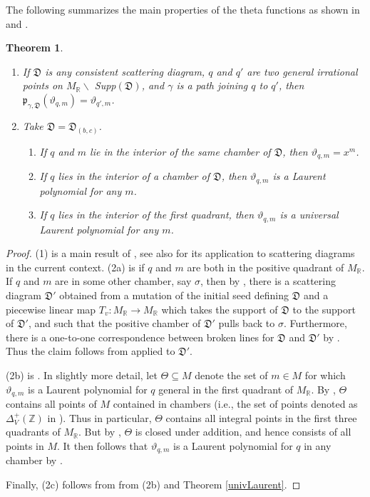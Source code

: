 \documentclass[11pt]{amsart}
\newtheorem{theorem}{Theorem}[section]
\theoremstyle{remark}
\numberwithin{equation}{section}
\newcommand{\RR}{\mathbb{R}}
\newcommand{\ZZ}{\mathbb{Z}}
\newcommand{\fD}{\mathfrak{D}}
\newcommand{\fp}{\mathfrak{p}}
\begin{document}
The following summarizes the main properties of the theta functions as shown in
\cite{CPS} and \cite{GHKK}.
\begin{theorem} $ $
  \begin{enumerate}
    \item
      If $\fD$ is any consistent scattering diagram, $q$ and $q'$ are two general
      irrational points on $M_{\RR} \smallsetminus$ Supp$(\fD)$, and $\gamma$ is a
      path joining $q$ to $q'$, then $\fp_{\gamma, \fD }(\vartheta_{q,m}) = \vartheta_{q', m}$. 
    \item Take $\fD=\fD_{(b,c)}$. 
      \begin{enumerate}
        \item If $q$ and $m$ lie in the interior of the same chamber of $\fD$, then $\vartheta_{q,m}=x^{m}$.
        \item If $q$ lies in the interior of a chamber of $\fD$, then $\vartheta_{q,m}$ is a Laurent polynomial for any $m$.
        \item If $q$ lies in the interior of the first quadrant, then $\vartheta_{q,m}$ is a universal Laurent polynomial for any $m$.
      \end{enumerate}
  \end{enumerate}
\end{theorem}

\begin{proof}
  (1) is a main result of \cite{CPS}, see also \cite[Theorem~3.5]{GHKK} for its
application to scattering diagrams in the current context. (2a) is 
\cite[Proposition~3.8]{GHKK} if $q$ and $m$ are both in the positive quadrant
of $M_{\RR}$. If $q$ and $m$ are in some other chamber, say $\sigma$, then
by \cite[Construction~1.38]{GHKK}, there is a scattering diagram $\fD'$
obtained from a mutation of the initial seed defining $\fD$ and a piecewise
linear map $T_v:M_{\RR}\rightarrow M_{\RR}$ which takes the support of
$\fD$ to the support of $\fD'$, and such that the positive chamber of $\fD'$
pulls back to $\sigma$. Furthermore, there is a one-to-one correspondence
between broken lines for $\fD$ and $\fD'$ by \cite[Proposition~3.6]{GHKK}.
Thus the claim follows from \cite[Proposition~3.8]{GHKK} applied to $\fD'$.

(2b) is \cite[Example~7.18]{GHKK}. In slightly more detail, let 
$\Theta\subseteq M$ denote the
set of $m\in M$ for which $\vartheta_{q,m}$ is a Laurent polynomial for
$q$ general in the first quadrant of $M_{\RR}$. By 
\cite[Theorem~7.16,(3)]{GHKK}, $\Theta$ contains all points of $M$
contained in chambers (i.e., the set of points denoted as $\Delta^+_V(\ZZ)$
in \cite[Theorem~7.16,(3)]{GHKK}). Thus in particular, $\Theta$ contains
all integral points in the first three quadrants of $M_{\RR}$. But
by \cite[Theorem~7.16,(4)]{GHKK}, $\Theta$ is closed under addition, and
hence consists of all points in $M$. It then follows that 
$\vartheta_{q,m}$ is a Laurent polynomial for $q$ in any chamber by
\cite[Proposition~7.1]{GHKK}.

Finally, (2c) follows from from (2b) and Theorem \ref{univLaurent}.
\end{proof}
\end{document}
